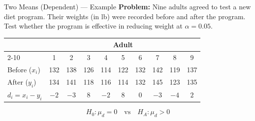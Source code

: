\documentclass[12pt, aspectratio=169]{beamer}
\begin{document}
    \begin{frame}{Two Means (Dependent) --- Example}
        \textbf{Problem:} Nine adults agreed to test a new diet program.
        Their weights (in lb) were recorded before and after the program.
        Test whether the program is effective in reducing weight at $\alpha = 0.05$.

        \vspace{0.5em}

        \begin{center}
            \small
            \begin{tabular}{lccccccccc}
                \toprule
                & \multicolumn{9}{c}{\textbf{Adult}} \\
                \cmidrule{2-10}
                & 1 & 2 & 3 & 4 & 5 & 6 & 7 & 8 & 9 \\
                \midrule
                Before ($x_i$) & 132 & 138 & 126 & 114 & 122 & 132 & 142 & 119 & 137 \\
                After  ($y_i$) & 134 & 141 & 118 & 116 & 114 & 132 & 145 & 123 & 135 \\
                $d_i = x_i - y_i$ & $-2$ & $-3$ & $8$ & $-2$ & $8$ & $0$ & $-3$ & $-4$ & $2$ \\
                \bottomrule
            \end{tabular}
        \end{center}

        \[
            H_0: \mu_d = 0 \quad \text{vs} \quad H_A: \mu_d > 0
        \]
    \end{frame}
\end{document}

